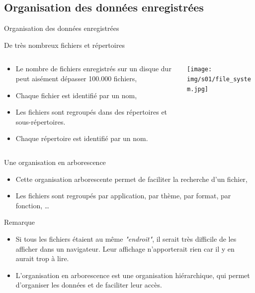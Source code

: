 \subsection{Organisation des données enregistrées}
\begin{frame}{Organisation des données enregistrées}
  \begin{block}{De très nombreux fichiers et répertoires}
    \begin{columns}
      \begin{column}{7cm}
        \begin{itemize}
        \item Le nombre de fichiers enregistrés sur un disque dur peut aisément dépasser 100.000 fichiers,
        \item Chaque fichier est identifié par un nom,
        \item Les fichiers sont regroupés dans des répertoires et sous-répertoires.
        \item Chaque répertoire est identifié par un nom.
        \end{itemize}
      \end{column}
      \begin{column}{4cm}
        \texttt{[image: img/s01/file\_system.jpg]}
      \end{column}
    \end{columns}
  \end{block}
  \begin{block}{Une organisation en arborescence}
    \begin{itemize}
    \item Cette organisation arborescente permet de faciliter la recherche d'un fichier,
    \item Les fichiers sont regroupés par application, par thème, par format, par fonction, \dots			\end{itemize}
  \end{block}
  \begin{alertblock}{Remarque}
    \begin{itemize}
    \item Si tous les fichiers étaient au même \textit{"endroit"}, il serait très difficile de les afficher dans un navigateur. Leur affichage n'apporterait rien car il y en aurait trop à lire.
    \item L'organisation en arborescence est une organisation hiérarchique, qui permet d'organiser les données et de faciliter leur accès.
    \end{itemize}
  \end{alertblock}
\end{frame}		






